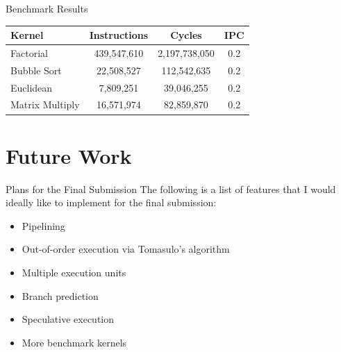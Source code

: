 \documentclass{beamer}
\begin{document}
\begin{frame}{Benchmark Results}
    \begin{table}[]
        \begin{center}
        \begin{tabular}{l|cc|c}
        \textbf{Kernel}&\textbf{Instructions}&\textbf{Cycles}&\textbf{IPC}\\
        \hline\hline
        Factorial&439,547,610&2,197,738,050&0.2\\
        \hline
        Bubble Sort&22,508,527&112,542,635&0.2\\
        \hline
        Euclidean&7,809,251&39,046,255&0.2\\
        \hline
        Matrix Multiply&16,571,974&82,859,870&0.2\\
        \end{tabular}
        \end{center}
    \end{table}
\end{frame}

\section{Future Work}

\begin{frame}{Plans for the Final Submission}
    The following is a list of features that I would ideally like to implement for the final submission:
    \begin{itemize}
        \item Pipelining
        \item Out-of-order execution via Tomasulo's algorithm
        \item Multiple execution units
        \item Branch prediction
        \item Speculative execution
        \item More benchmark kernels
    \end{itemize}
\end{frame}
\end{document}
